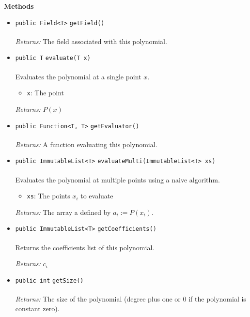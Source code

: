 \textbf{\sffamily Methods}
\begin{itemize}
\item \lstinline|public Field<T>| \lstinline|getField|\lstinline|()|\\ \\[-0.6em]
\emph{Returns:} The field associated with this polynomial.



\item \lstinline|public T| \lstinline|evaluate|\lstinline|(T x)|\\ \\[-0.6em]
Evaluates the polynomial at a single point $x$.
\begin{itemize}
\item \lstinline|x|: The point
\end{itemize}

\emph{Returns:} $P(x)$

\item \lstinline|public Function<T, T>| \lstinline|getEvaluator|\lstinline|()|\\ \\[-0.6em]
\emph{Returns:} A function evaluating this polynomial.



\item \lstinline|public ImmutableList<T>| \lstinline|evaluateMulti|\lstinline|(ImmutableList<T> xs)|\\ \\[-0.6em]
Evaluates the polynomial at multiple points using a naive algorithm.
\begin{itemize}
\item \lstinline|xs|: The points $x_i$ to evaluate
\end{itemize}

\emph{Returns:} The array a defined by $a_i := P(x_i)$.

\item \lstinline|public ImmutableList<T>| \lstinline|getCoefficients|\lstinline|()|\\ \\[-0.6em]
Returns the coefficients list of this polynomial.

\emph{Returns:} $c_i$

\item \lstinline|public int| \lstinline|getSize|\lstinline|()|\\ \\[-0.6em]
\emph{Returns:} The size of the polynomial (degree plus one or 0 if the polynomial
 is constant zero).




\end{itemize}
